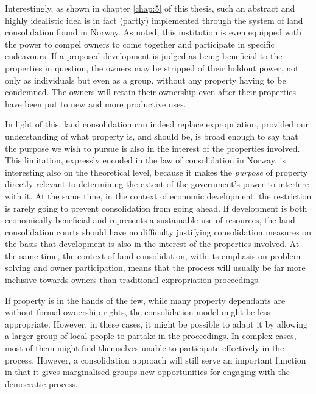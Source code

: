 Interestingly, as shown in chapter \ref{chap:5} of this thesis, such an abstract and highly idealistic idea is in fact (partly) implemented through the system of land consolidation found in Norway. As noted, this institution is even equipped with the power to compel owners to come together and participate in specific endeavours. If a proposed development is judged as being beneficial to the properties in question, the owners may be stripped of their holdout power, not only as individuals but even as a group, without any property having to be condemned. The owners will retain their ownership even after their properties have been put to new and more productive uses.

In light of this, land consolidation can indeed replace expropriation, provided our understanding of what property is, and should be, is broad enough to say that the purpose we wish to pursue is also in the interest of the properties involved. This limitation, expressly encoded in the law of consolidation in Norway, is interesting also on the theoretical level, because it makes the {\it purpose} of property directly relevant to determining the extent of the government's power to interfere with it. At the same time,  in the context of economic development, the restriction is rarely going to prevent consolidation from going ahead. If development is both economically beneficial and represents a sustainable use of resources, the land consolidation courts should have no difficulty justifying consolidation measures on the basis that development is also in the interest of the properties involved. At the same time, the context of land consolidation, with its emphasis on problem solving and owner participation, means that the process will usually be far more inclusive towards owners than traditional expropriation proceedings. 

If property is in the hands of the few, while many property dependants are without formal ownership rights, the consolidation model might be less appropriate. However, in these cases, it might be possible to adapt it by allowing a larger group of local people to partake in the proceedings. In complex cases, most of them might find themselves unable to participate effectively in the process. However, a consolidation approach will still serve an important function in that it gives marginalised groups new opportunities for engaging with the democratic process.


